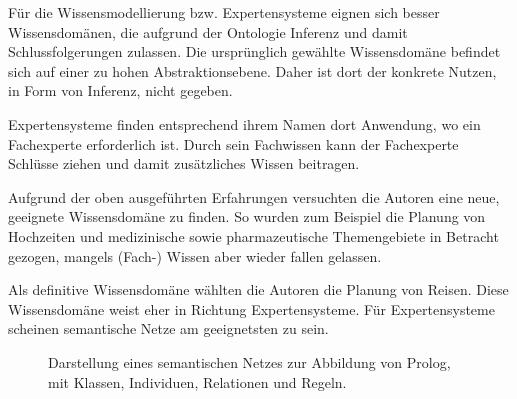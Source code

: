 Für die Wissensmodellierung bzw. Expertensysteme eignen sich besser Wissensdomänen, die aufgrund der Ontologie Inferenz und damit Schlussfolgerungen zulassen. Die ursprünglich gewählte Wissensdomäne befindet sich auf einer zu hohen Abstraktionsebene. Daher ist dort der konkrete Nutzen, in Form von Inferenz, nicht gegeben.

Expertensysteme finden entsprechend ihrem Namen dort Anwendung, wo ein Fachexperte erforderlich ist. Durch sein Fachwissen kann der Fachexperte Schlüsse ziehen und damit zusätzliches Wissen beitragen.

Aufgrund der oben ausgeführten Erfahrungen versuchten die Autoren eine neue, geeignete Wissensdomäne zu finden. So wurden zum Beispiel die Planung von Hochzeiten und medizinische sowie pharmazeutische Themengebiete in Betracht gezogen, mangels (Fach-) Wissen aber wieder fallen gelassen.

Als definitive Wissensdomäne wählten die Autoren die Planung von Reisen. Diese Wissensdomäne weist eher in Richtung Expertensysteme. Für Expertensysteme scheinen semantische Netze am geeignetsten zu sein.

\begin{figure}[H]
\centering {}
\caption{Darstellung eines semantischen Netzes zur Abbildung von Prolog, mit Klassen, Individuen, Relationen und Regeln.\label{fig:prolog_netz}\protect\footnotemark}
\end{figure}

